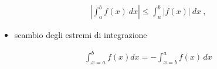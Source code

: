 \documentclass[letterpaper,10pt,english]{jupyterBook}
\begin{document}
\begin{equation}\label{equation:ch/infinitesimal_calculus/integrals:infinitesimal-calculus:integrals:prop:abs}
\begin{split}\left| \int_a^b f(x) \ dx \right| \le \int_a^b | f(x) | \ dx \ ,\end{split}
\end{equation}\begin{itemize}
\item {} 
\sphinxAtStartPar
scambio degli estremi di integrazione

\end{itemize}
\begin{equation}\label{equation:ch/infinitesimal_calculus/integrals:infinitesimal-calculus:integrals:prop:swap}
\begin{split}\int_{x=a}^{b} f(x) dx = - \int_{x=b}^{a} f(x) \, dx\end{split}
\end{equation}
\end{document}
